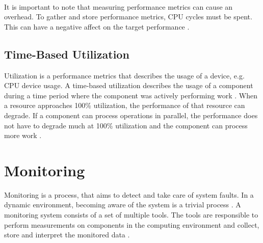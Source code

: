 \paragraph{}It is important to note that measuring performance metrics can cause an overhead. To gather and store performance metrics, CPU cycles must be spent. This can have a negative affect on the target performance \cite{Greg2020SysPerf}.


\subsection{Time-Based Utilization}
Utilization is a performance metrics that describes the usage of a device, e.g. CPU device usage.
A time-based utilization describes the usage of a component during a time period where the component was actively performing work \cite{Greg2020SysPerf}.
When a resource approaches 100\% utilization, the performance of that resource can degrade. If a component can process operations in parallel, the performance does not have to degrade much at 100\% utilization and the component can process more work \cite{Greg2020SysPerf}.


\section{Monitoring}
\label{sec:02_monitoring}
Monitoring is a process, that aims to detect and take care of system faults. In a dynamic environment, becoming aware of the system is a trivial process \cite{Ligus2012EffMonitoring}.
A monitoring system consists of a set of multiple tools. The tools are responsible to perform measurements on components in the computing environment and collect, store and interpret the monitored data \cite{Ligus2012EffMonitoring}. 


